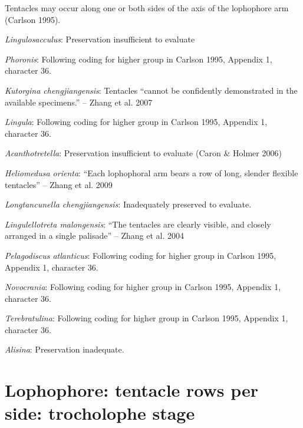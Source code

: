 \documentclass[]{book}
\theoremstyle{definition}
\theoremstyle{definition}
\theoremstyle{definition}
\theoremstyle{remark}
\begin{document}
Tentacles may occur along one or both sides of the axis of the
lophophore arm (Carlson 1995).

\emph{Lingulosacculus}: Preservation insufficient to evaluate

\emph{Phoronis}: Following coding for higher group in Carlson 1995,
Appendix 1, character 36.

\emph{Kutorgina chengjiangensis}: Tentacles ``cannot be confidently
demonstrated in the available specimens.'' -- Zhang et al. 2007

\emph{Lingula}: Following coding for higher group in Carlson 1995,
Appendix 1, character 36.

\emph{Acanthotretella}: Preservation insufficient to evaluate (Caron \&
Holmer 2006)

\emph{Heliomedusa orienta}: ``Each lophophoral arm bears a row of long,
slender flexible tentacles'' -- Zhang et al. 2009

\emph{Longtancunella chengjiangensis}: Inadequately preserved to
evaluate.

\emph{Lingulellotreta malongensis}: ``The tentacles are clearly visible,
and closely arranged in a single palisade'' -- Zhang et al. 2004

\emph{Pelagodiscus atlanticus}: Following coding for higher group in
Carlson 1995, Appendix 1, character 36.

\emph{Novocrania}: Following coding for higher group in Carlson 1995,
Appendix 1, character 36.

\emph{Terebratulina}: Following coding for higher group in Carlson 1995,
Appendix 1, character 36.

\emph{Alisina}: Preservation inadequate.

\hypertarget{lophophore-tentacle-rows-per-side-trocholophe-stage}{%
\section*{Lophophore: tentacle rows per side: trocholophe
stage}\label{lophophore-tentacle-rows-per-side-trocholophe-stage}}
\end{document}
